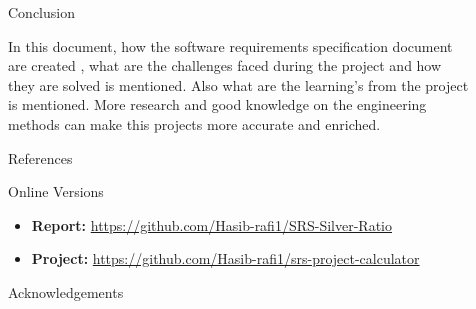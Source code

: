 \documentclass[final]{beamer}
\newlength{\sepwid}
\newlength{\onecolwid}
\newlength{\twocolwid}
\begin{document}
\begin{frame}[t]
\begin{columns}[t]
\begin{column}{\twocolwid}

\end{column} %

\begin{column}{\sepwid}\end{column} %

\begin{column}{\onecolwid} %



\begin{block}{Conclusion}

In this document, how the software requirements specification document are created , what are the challenges faced during the project and how they are solved is mentioned. Also what are the learning's from the project is mentioned. 
More research and good knowledge on the engineering methods can make this projects more accurate and enriched.   

\end{block}


\begin{block}{References}
\nocite{*} %
\small{
\vspace{0.0in}}
\end{block}

\begin{block}{Online Versions}
\begin{itemize}
\item \textbf{Report:} \url{https://github.com/Hasib-rafi1/SRS-Silver-Ratio}
\item \textbf{Project:} \url{https://github.com/Hasib-rafi1/srs-project-calculator}
\end{itemize}
\end{block}
\begin{block}{Acknowledgements}
\small{} \\


\end{block}
\end{column}
\end{columns}
\end{frame}
\end{document}
